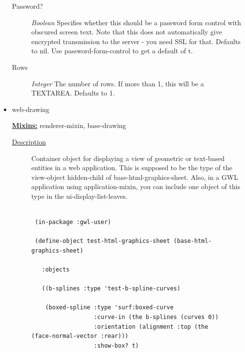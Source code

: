 \documentclass [11pt]{book}
\begin{document}
\begin{itemize}
\begin{description}
\item [Password?]
\emph{Boolean} Specifies whether this should be a password form control with obscured screen text.
Note that this does not automatically give encrypted transmission to the server - you need SSL
for that. Defaults to nil. Use password-form-control to get a default of t.


\item [Rows]
\emph{Integer} The number of rows. If more than 1, this will be a TEXTAREA. Defaults to 1.


\end{description}







\item {}web-drawing


\textbf{
\underline{Mixins:}} renderer-mixin, base-drawing





\begin{description}

\item [
\underline{Description}]


Container object for displaying a view of geometric 
or text-based entities in a web application. This is supposed to be the type of the
view-object hidden-child of base-html-graphics-sheet. Also, in a GWL application using 
application-mixin, you can include one object of this type in the ui-display-list-leaves.




\end{description}




\begin{figure}
\begin{lrbox}{\boxedverb}
\begin{minipage}{\linewidth}
{\small

\begin{verbatim}

 (in-package :gwl-user)

 (define-object test-html-graphics-sheet (base-html-graphics-sheet)
    
   :objects 

   ((b-splines :type 'test-b-spline-curves)
   
    (boxed-spline :type 'surf:boxed-curve
                  :curve-in (the b-splines (curves 0))
                  :orientation (alignment :top (the (face-normal-vector :rear)))
                  :show-box? t)


\end{verbatim}}
\end{minipage}
\end{lrbox}
\end{figure}
\end{itemize}
\end{document}
